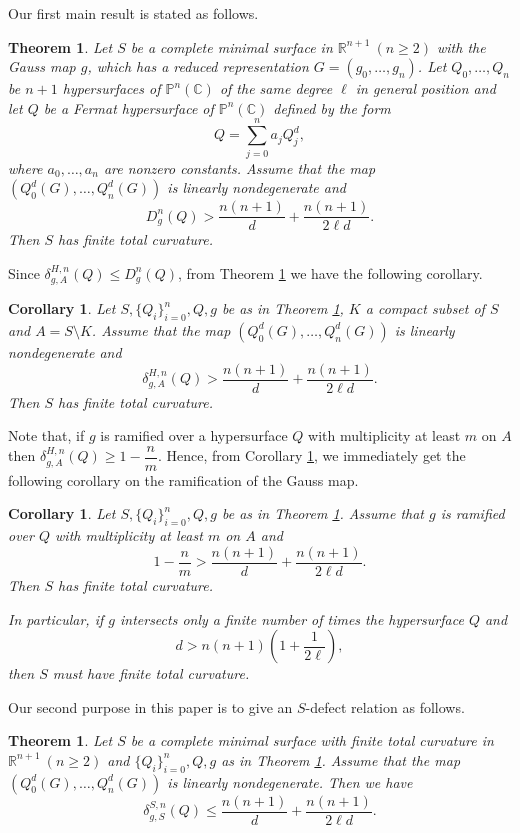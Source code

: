 \documentclass[12pt,article]{amsart}
\newtheorem{corollary}[equation]{Corollary}
\newtheorem{theorem}[equation]{Theorem}
\newcommand{\C}{{\mathbb{C}}}
\renewcommand{\P}{{\mathbb{P}}}
\newcommand{\R}{{\mathbb{R}}}
\numberwithin{equation}{section}
\begin{document}
Our first main result is stated as follows.
 
\begin{theorem}\label{1.1} 
Let $S$ be a complete minimal surface in $\R^{n+1}\ (n\ge 2)$ with the Gauss map $g$, which has a reduced representation $G=(g_0,\ldots,g_n)$. Let $Q_0,\ldots,Q_n$ be $n+1$ hypersurfaces of $\P^n(\C)$ of the same degree $\ell$ in general position and let $Q$ be a Fermat hypersurface of $\P^n(\C)$ defined by the form
$$Q=\sum_{j=0}^na_jQ_j^d,$$
where $a_0,\ldots,a_n$ are nonzero constants.
Assume that the map $(Q_0^d(G),\ldots,Q_n^d(G))$ is linearly nondegenerate and 
$$D^{n}_{g}(Q)>\frac{n(n+1)}{d}+\frac{n(n+1)}{2\ell d}.$$
Then $S$ has finite total curvature.
\end{theorem}
Since $\delta^{H,n}_{g,A}(Q)\le D^{n}_{g}(Q)$, from Theorem \ref{1.1} we have the following corollary.
\begin{corollary}\label{1.2} 
Let $S,\{Q_i\}_{i=0}^n,Q,g$ be as in Theorem \ref{1.1}, $K$ a compact subset of $S$ and $A=S\setminus K$. Assume that the map $(Q_0^d(G),\ldots,Q_n^d(G))$ is linearly nondegenerate and
$$\delta^{H,n}_{g,A}(Q)>\frac{n(n+1)}{d}+\frac{n(n+1)}{2\ell d}.$$
Then $S$ has finite total curvature.
\end{corollary}

Note that, if $g$ is ramified over a hypersurface $Q$ with multiplicity at least $m$ on $A$ then $\delta^{H,n}_{g,A}(Q)\ge 1-\dfrac{n}{m}$. Hence, from Corollary \ref{1.2}, we immediately get the following corollary on the ramification of the Gauss map.
\begin{corollary}\label{1.4}
Let $S,\{Q_i\}_{i=0}^n,Q,g$ be as in Theorem \ref{1.1}. Assume that $g$ is ramified over $Q$ with multiplicity at least $m$ on $A$ and
$$1-\frac{n}{m}>\frac{n(n+1)}{d}+\frac{n(n+1)}{2\ell d}.$$
Then $S$ has finite total curvature.

In particular, if $g$ intersects only a finite number of times the hypersurface $Q$ and 
$$d>n(n+1)\left(1+\frac{1}{2\ell}\right),$$
then $S$ must have finite total curvature.
\end{corollary}

Our second purpose in this paper is to give an $S$-defect relation as follows. 
\begin{theorem}\label{1.3} 
Let $S$ be a complete minimal surface with finite total curvature in $\R^{n+1}\ (n\ge 2)$ and $\{Q_i\}_{i=0}^n,Q,g$ as in Theorem \ref{1.1}. Assume that the map $(Q_0^d(G),\ldots,Q_n^d(G))$ is linearly nondegenerate. Then we have
$$\delta^{S,n}_{g,S}(Q)\le\frac{n(n+1)}{d}+\frac{n(n+1)}{2\ell d}.$$
\end{theorem}
 
\end{document}
